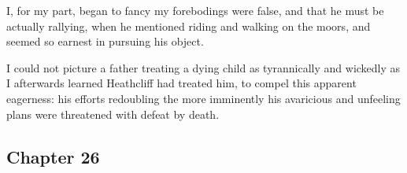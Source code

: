 \par I, for my part, began to fancy my forebodings were false, and that he must be actually rallying, when he mentioned riding and walking on the moors, and seemed so earnest in pursuing his object.
\par I could not picture a father treating a dying child as tyrannically and wickedly as I afterwards learned Heathcliff had treated him, to compel this apparent eagerness: his efforts redoubling the more imminently his avaricious and unfeeling plans were threatened with defeat by death.



\subsection*{Chapter 26}

